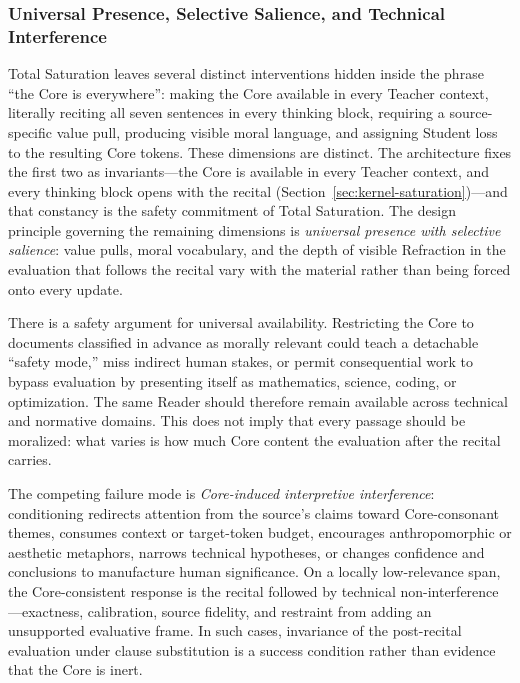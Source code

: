 \subsubsection{Universal Presence, Selective Salience, and Technical Interference}
\label{sec:core-technical-interference}

Total Saturation leaves several distinct interventions hidden inside the phrase
``the Core is everywhere'': making the Core available in every Teacher context,
literally reciting all seven sentences in every thinking block, requiring a
source-specific value pull, producing visible moral language, and assigning
Student loss to the resulting Core tokens. These dimensions are distinct. The
architecture fixes the first two as invariants---the Core is available in every
Teacher context, and every thinking block opens with the recital
(Section~\ref{sec:kernel-saturation})---and that constancy is the safety
commitment of Total Saturation. The design principle governing the remaining
dimensions is \emph{universal presence with selective salience}: value pulls,
moral vocabulary, and the depth of visible Refraction in the evaluation that
follows the recital vary with the material rather than being forced onto every
update.

There is a safety argument for universal availability. Restricting the Core to
documents classified in advance as morally relevant could teach a detachable
``safety mode,'' miss indirect human stakes, or permit consequential work to
bypass evaluation by presenting itself as mathematics, science, coding, or
optimization. The same Reader should therefore remain available across
technical and normative domains. This does not imply that every passage should
be moralized: what varies is how much Core content the evaluation after the
recital carries.

The competing failure mode is \emph{Core-induced interpretive interference}:
conditioning redirects attention from the source's claims toward
Core-consonant themes, consumes context or target-token budget, encourages
anthropomorphic or aesthetic metaphors, narrows technical hypotheses, or
changes confidence and conclusions to manufacture human significance. On a
locally low-relevance span, the Core-consistent response is the recital
followed by technical non-interference---exactness, calibration, source
fidelity, and restraint from adding an unsupported evaluative frame. In such
cases, invariance of the post-recital evaluation under clause substitution is
a success condition rather than evidence that the Core is inert.

